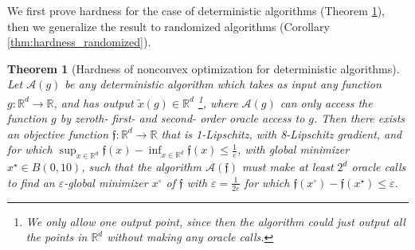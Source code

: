 \documentclass[11pt,letterpaper]{article}
\renewcommand{\epsilon}{\varepsilon}
\newtheorem{theorem}{Theorem}[section]
\begin{document}
We first prove hardness for the case of deterministic algorithms (Theorem \ref{thm:hardness_deterministic}), then we generalize the result to randomized algorithms (Corollary \ref{thm:hardness_randomized}).

\begin{theorem}[Hardness of nonconvex optimization for deterministic algorithms] \label{thm:hardness_deterministic}
%
Let $\mathcal{A}(g)$ be any deterministic algorithm which takes as input any function $g: \mathbb{R}^d \rightarrow \mathbb{R}$,  and has output $\tilde{x}(g) \in \mathbb{R}^d$ \footnote{We only allow one output point, since then the algorithm could just output all the points in $\mathbb{R}^d$ without making any oracle calls.}, where $\mathcal{A}(g)$ can only access the function $g$ by zeroth- first- and second- order oracle access to $g$. 
%
 Then there exists an objective function $\mathfrak{f}: \mathbb{R}^d \rightarrow \mathbb{R}$ that is 1-Lipschitz, with 8-Lipschitz gradient, and for which $\sup_{x\in \mathbb{R}^d} \mathfrak{f}(x) - \inf_{x\in \mathbb{R}^d} \mathfrak{f}(x) \leq \frac{1}{e}$, with global minimizer $x^\star \in B(0,10)$, such that the algorithm $\mathcal{A}(\mathfrak{f})$ must make at least $2^d$ oracle calls to find an $\epsilon$-global minimizer $x^\circ$ of $\mathfrak{f}$ with $\epsilon = \frac{1}{2e}$ for which $\mathfrak{f}(x^\circ) - \mathfrak{f}(x^\star) \leq \epsilon$.
\end{theorem}
%
\end{document}
